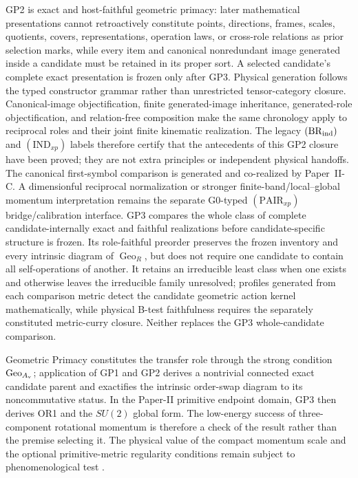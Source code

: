 \documentclass[12pt,a4paper]{article}
\begin{document}
GP2 is exact and host-faithful geometric primacy: later mathematical
presentations cannot retroactively constitute points, directions, frames,
scales, quotients, covers, representations, operation laws, or cross-role
relations as prior selection marks, while every item and canonical
nonredundant image generated inside a candidate must be retained in its proper
sort.  A selected candidate's complete exact presentation is frozen only after
GP3.  Physical generation follows the typed
constructor grammar rather than unrestricted tensor-category closure.
Canonical-image objectification, finite generated-image inheritance,
generated-role objectification, and relation-free composition make the same
chronology apply to reciprocal roles and their joint finite kinematic
realization.  The legacy \((\mathrm{BR}_{\rm ind})\) and
\((\mathrm{IND}_{xp})\) labels therefore certify that the antecedents of this
GP2 closure have been proved; they are not extra principles or independent
physical handoffs.  The canonical first-symbol comparison is generated and
co-realized by Paper~II-C.  A dimensionful reciprocal normalization or
stronger finite-band/local--global momentum interpretation remains the
separate G0-typed \((\mathrm{PAIR}_{xp})\) bridge/calibration interface.
GP3 compares the whole class of complete candidate-internally exact and
faithful realizations before candidate-specific structure is frozen.  Its
role-faithful preorder preserves the frozen inventory and every intrinsic
diagram of \(\operatorname{Geo}_R\), but does not require one candidate to
contain all self-operations of another.  It retains an irreducible least class
when one exists and otherwise leaves the irreducible family unresolved;
profiles generated from each comparison metric detect the
candidate geometric action kernel mathematically, while physical B-test
faithfulness requires the separately constituted metric-curry closure.  Neither
replaces the GP3 whole-candidate comparison.

Geometric Primacy constitutes the transfer role through the strong condition
\(\operatorname{Geo}_{A_{\rm v}}\); application of GP1 and GP2 derives a
nontrivial connected exact candidate parent and exactifies the intrinsic
order-swap diagram to its noncommutative status.  In the Paper-II primitive
endpoint domain, GP3 then derives OR1 and the \(SU(2)\) global form.  The
low-energy success of
three-component rotational momentum is therefore a check of the result rather
than the premise selecting it.  The physical value of the compact momentum
scale and the optional primitive-metric regularity conditions remain subject
to phenomenological test
\cite{Mattingly2005,KosteleckyRussell2011}.
\end{document}
